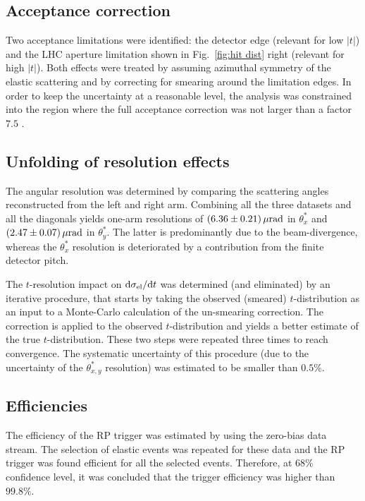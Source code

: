 \documentclass[doublecol]{epl/epl2}
\def\d{{\rm d}}
\def\un#1{\,{\rm #1}}
\begin{document}
\subsection{Acceptance correction}

Two acceptance limitations were identified: the detector edge (relevant for low $|t|$) and the LHC aperture limitation shown in Fig.~\ref{fig:hit dist} right (relevant for high $|t|$). Both effects were treated by assuming azimuthal symmetry of the elastic scattering and by correcting for smearing around the limitation edges. In order to keep the uncertainty at a reasonable level, the analysis was constrained into the region where the full acceptance correction was not larger than a factor $7.5$%
.


\subsection{Unfolding of resolution effects}

The angular resolution was determined by comparing the scattering angles reconstructed from the left and right arm. Combining all the three datasets and all the diagonals yields one-arm resolutions of $(6.36\pm 0.21)\un{\mu rad}$ in $\theta^*_x$ and $(2.47\pm 0.07)\un{\mu rad}$ in $\theta^*_y$. The latter is predominantly due to the beam-divergence, whereas the $\theta^*_x$ resolution is deteriorated by a contribution from the finite detector pitch.

The $t$-resolution impact on $\d\sigma_{\rm el}/\d t$  was determined (and eliminated) by an iterative procedure, that starts by taking the observed (smeared) $t$-distribution as an input to a Monte-Carlo calculation of the un-smearing correction. The correction is applied to the observed $t$-distribution and yields a better estimate of the true $t$-distribution. These two steps were repeated three times to reach convergence. The systematic uncertainty of this procedure (due to the uncertainty of the $\theta^*_{x, y}$ resolution) was estimated to be smaller than $0.5\%$.

\subsection{Efficiencies}

The efficiency of the RP trigger was estimated by using the zero-bias data stream. The selection of elastic events was repeated for these data and the RP trigger was found efficient for all the selected events. Therefore, at $68\%$ confidence level, it was concluded that the trigger efficiency was higher than $99.8\%$.
\end{document}
